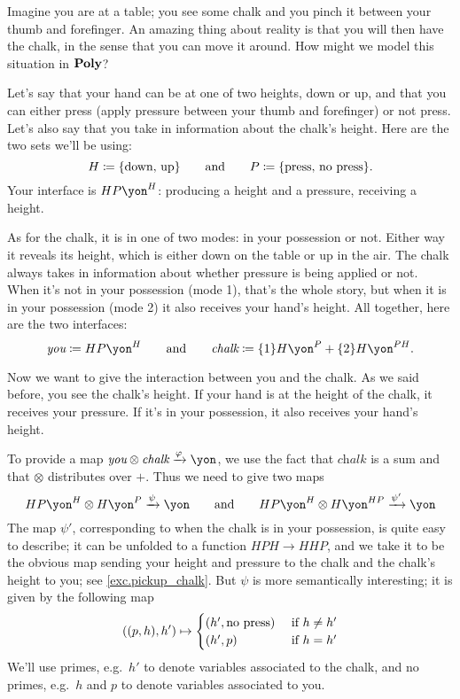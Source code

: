 \documentclass[Book-Poly]{subfiles}
\begin{document}
\begin{example}\label{ex.pickup_chalk}
Imagine you are at a table; you see some chalk and you pinch it between your thumb and forefinger. An amazing thing about reality is that you will then have the chalk, in the sense that you can move it around. How might we model this situation in $\textbf{Poly}$?

Let's say that your hand can be at one of two heights, down or up, and that you can either press (apply pressure between your thumb and forefinger) or not press. Let's also say that you take in information about the chalk's height. Here are the two sets we'll be using:
\[
	H\coloneqq\{\text{down, up}\}
	\qquad\text{and}\qquad
	P\coloneqq\{\text{press, no press}\}.
\]
Your interface is $HP\yon^H$: producing a height and a pressure, receiving a height.

As for the chalk, it is in one of two modes: in your possession or not. Either way it reveals its height, which is either down on the table or up in the air. The chalk always takes in information about whether pressure is being applied or not. When it's not in your possession (mode 1), that's the whole story, but when it is in your possession (mode 2) it also receives your hand's height. All together, here are the two interfaces:
\[
	\textit{you}\coloneqq HP\yon^H
	\qqand
	\textit{chalk}\coloneqq \{1\}H\yon^P + \{2\}H\yon^{PH}.
\]

Now we want to give the interaction between you and the chalk. As we said before, you see the chalk's height. If your hand is at the height of the chalk, it receives your pressure. If it's in your possession, it also receives your hand's height. 

To provide a map $\textit{you}\otimes\textit{chalk}\To{\varphi}\yon$, we use the fact that $\textit{chalk}$ is a sum and that $\otimes$ distributes over $+$. Thus we need to give two maps
\[
	HP\yon^H\otimes H\yon^P\To{\psi}\yon
	\qqand
	HP\yon^H\otimes H\yon^{HP}\To{\psi'}\yon
\]
The map $\psi'$, corresponding to when the chalk is in your possession, is quite easy to describe; it can be unfolded to a function
$HPH\to HHP$, and we take it to be the obvious map sending your height and pressure to the chalk and the chalk's height to you; see \cref{exc.pickup_chalk}. But $\psi$ is more semantically interesting; it is given by the following map
\[
  ((p,h),h')\mapsto
  \begin{cases}
  	(h',\text{no press})&\textnormal{ if }h\neq h'\\
  	(h',p)&\textnormal{ if }h= h'
  \end{cases}
\]
We'll use primes, e.g.\ $h'$ to denote variables associated to the chalk, and no primes, e.g.\ $h$ and $p$ to denote variables associated to you.


\end{example}
\end{document}
